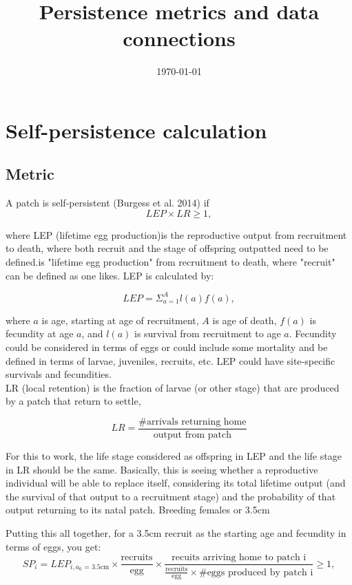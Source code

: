 \documentclass[12pt, oneside]{article}   	%
\title{Persistence metrics and data connections}
\begin{document}
\date{\today}
\maketitle{}
\section{Self-persistence calculation}
\subsection*{Metric}
A patch is self-persistent (Burgess et al. 2014) if
\begin{equation}
LEP \times LR \geq 1,
\end{equation}

where LEP (lifetime egg production)is the reproductive output from recruitment to death, where both recruit and the stage of offspring outputted need to be defined.is "lifetime egg production" from recruitment to death, where "recruit" can be defined as one likes. LEP is calculated by:

\begin{equation}
LEP = \Sigma_{a = 1}^{A} l(a)f(a),
\end{equation}

where $a$ is age, starting at age of recruitment, $A$ is age of death, $f(a)$ is fecundity at age $a$, and $l(a)$ is survival from recruitment to age $a$. Fecundity could be considered in terms of eggs or could include some mortality and be defined in terms of larvae, juveniles, recruits, etc. LEP could have site-specific survivals and fecundities.\\ %

LR (local retention) is the fraction of larvae (or other stage) that are produced by a patch that return to settle,

\begin{equation}
LR = \frac{\text{\# arrivals returning home}}{\text{output from patch}}
\end{equation}

For this to work, the life stage considered as offspring in LEP and the life stage in LR should be the same. Basically, this is seeing whether a reproductive individual will be able to replace itself, considering its total lifetime output (and the survival of that output to a recruitment stage) and the probability of that output returning to its natal patch. Breeding females or 3.5cm 

Putting this all together, for a 3.5cm recruit as the starting age and fecundity in terms of eggs, you get:
\begin{equation}
SP_i = LEP_{i, \text{$a_0$ = 3.5cm}} \times \frac{\text{recruits}}{\text{egg}} \times \frac{\text{recuits arriving home to patch i}}{\frac{\text{recruits}}{\text{egg}} \times \# \text{eggs produced by patch i}} \geq 1, 
\end{equation}
\end{document}
